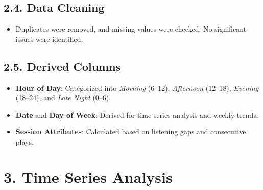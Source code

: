 \documentclass[12pt]{article}
\begin{document}
\begin{itemize}
\subsection*{2.4. Data Cleaning}
\begin{itemize}
\item Duplicates were removed, and missing values were checked. No significant issues were identified.
\end{itemize}

\subsection*{2.5. Derived Columns}
\begin{itemize}
\item \textbf{Hour of Day}: Categorized into \textit{Morning} (6--12), \textit{Afternoon} (12--18), \textit{Evening} (18--24), and \textit{Late Night} (0--6).
\item \textbf{Date} and \textbf{Day of Week}: Derived for time series analysis and weekly trends.
\item \textbf{Session Attributes}: Calculated based on listening gaps and consecutive plays.
\end{itemize}
\section*{3. Time Series Analysis}

\end{itemize}
\end{document}
